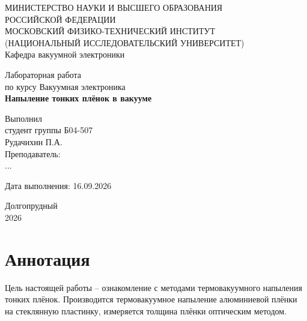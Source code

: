 \documentclass[a4paper, 14pt]{extarticle}
\begin{document}
	
	\begin{titlepage}
		\centering
		{\small МИНИСТЕРСТВО НАУКИ И ВЫСШЕГО ОБРАЗОВАНИЯ \\ РОССИЙСКОЙ ФЕДЕРАЦИИ\\
		МОСКОВСКИЙ ФИЗИКО-ТЕХНИЧЕСКИЙ ИНСТИТУТ\\
		(НАЦИОНАЛЬНЫЙ ИССЛЕДОВАТЕЛЬСКИЙ УНИВЕРСИТЕТ)\\
		\vspace {1cm}
		Кафедра вакуумной электроники\\}
		
		\vspace{4cm}
		
		Лабораторная работа \\
		по курсу Вакуумная электроника\\
		{\Large \textbf{Напыление тонких плёнок в вакууме}\\}
		
		\vspace{3cm}
		
		\raggedright
			\hspace{100mm} Выполнил \\
			
			\hspace{100mm} студент группы Б04-507 \\
			
			\hspace{100mm} Рудачихин П.А. \\
			\vspace{0.5cm}
			\hspace{100mm} Преподаватель: \\
			
			\hspace{100mm} ...
			
			\vspace{0.5cm}
			
			\hspace{100mm} Дата выполнения: 16.09.2026
			
		\centering
		
		
		\vfill
		
		Долгопрудный \\
		2026
	\end{titlepage}
	
	\section{Аннотация}
	
	\hspace{5mm} Цель настоящей работы -- ознакомление с методами термовакуумного напыления тонких плёнок. Производится термовакуумное напыление алюминиевой плёнки на стеклянную пластинку, измеряется толщина плёнки оптическим методом.
	
\end{document}
